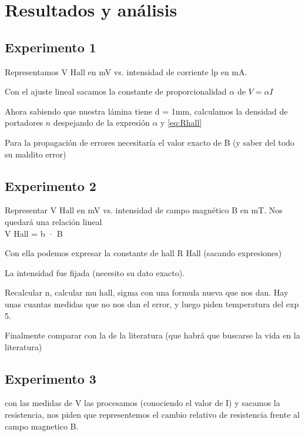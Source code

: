 

\section{Resultados y análisis}

\subsection{Experimento 1}

Representamos V Hall en mV vs. intensidad de corriente lp en mA.

Con el ajuste lineal sacamos la constante de proporcionalidad $\alpha$ de $V = \alpha I$

Ahora sabiendo que nuestra lámina tiene d = 1mm, calculamos la densidad de portadores $n$ despejando de la expresión $\alpha $ y \eqref{eq:Rhall}

Para la propagación de errores necesitaría el valor exacto de B (y saber del todo su maldito error)


\subsection{Experimento 2}

Representar V Hall en mV vs. intensidad de campo magnético B en mT.
Nos quedará una relación lineal\\
V Hall = b · B

Con ella podemos expresar la constante de hall R Hall (sacando expresiones)

La intensidad fue fijada (necesito su dato exacto). 

Recalcular n, calcular mu hall, sigma con una formula nueva que nos dan. Hay unas cuantas medidas que no nos dan el error, y luego piden temperatura del exp 5. 

Finalmente comparar con la de la literatura (que habrá que buscarse la vida en la literatura)


\subsection{Experimento 3}

con las medidas de V las procesamos (conociendo el valor de I) y sacamos la resistencia, nos piden que representemos el cambio relativo de resistencia frente al campo magnetico B.

